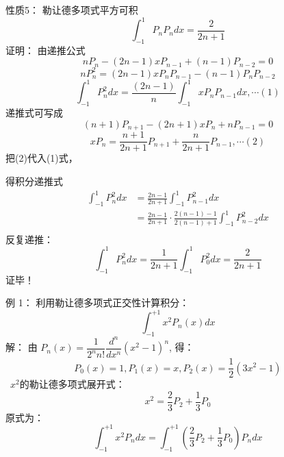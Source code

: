 \begin{frame}
	\alert{性质5：} 勒让德多项式平方可积
	\begin{equation*}
		\int_{-1}^{1} P_nP_n dx = \frac{2}{2n+1}
	\end{equation*}	
	\alert{证明：}  由递推公式
	\begin{equation*}
		nP_{n} -(2n-1)x P_{n-1} + (n-1)P_{n-2}  =0
	\end{equation*}		
	\begin{equation*}
		nP ^2 _{n} =(2n-1)x P_n P_{n-1} - (n-1)P_nP_{n-2} 
	\end{equation*}		
	\begin{equation*}
		\int_{-1}^{1}  P ^2 _{n} dx = \frac{(2n-1)}{n} \int_{-1}^{1}  x P_n P_{n-1} dx , \cdots (1)
	\end{equation*}	
	递推式可写成
	\begin{equation*}
		(n+1)P_{n+1} -(2n+1)x P_{n} + nP_{n-1}  =0  
	\end{equation*}		
	\begin{equation*}	
		x P_{n}=\frac{n+1}{2n+1}P_{n+1} + \frac{n}{2n+1}P_{n-1} , \cdots (2)
	\end{equation*}	
	把(2)代入(1)式，
\end{frame}	

\begin{frame}	
	得积分递推式
	\begin{align*}
		\int_{-1}^{1}  P ^2 _{n} dx &=  \frac{2n-1}{2n+1}\int_{-1}^{1}   P^2_{n-1} dx \\
		&=  \frac{2n-1}{2n+1} \cdot \frac{2(n-1)-1}{2(n-1)+1} \int_{-1}^{1}   P^2_{n-2} dx \\
	\end{align*}		
	反复递推：
	\begin{equation*}
		\int_{-1}^{1}  P ^2 _{n} dx =  \frac{1}{2n+1}\int_{-1}^{1}   P^2_{0} dx = \frac{2}{2n+1}
	\end{equation*}		
	\alert{证毕！} 
\end{frame}	


\begin{frame}
	\alert{例 1：}	利用勒让德多项式正交性计算积分：
	\begin{equation*}
		\int_{-1}^{+1} x^2 P _{n}(x) dx 
	\end{equation*}		
	\alert{解：} 由 $ P_{n}(x)=\dfrac{1}{2^{n} n !} \dfrac{d^{n}}{d x^{n}}\left(x^{2}-1\right)^{n} $, 得：
	\begin{equation*}
		P_0(x)=1, 	P_1(x)=x,  P_2(x)= \dfrac{1}{2}(3x^2-1)  
	\end{equation*}	
	 $x^2$的勒让德多项式展开式：
	$$ x^2 =\dfrac{2}{3}P_2+\dfrac{1}{3}P_0$$
	原式为：
	\begin{equation*}
			\int_{-1}^{+1} x^2 P _{n} dx = \int_{-1}^{+1} (\dfrac{2}{3}P_2+\dfrac{1}{3}P_0)  P _{n} dx 	
	\end{equation*}	
\end{frame}	

